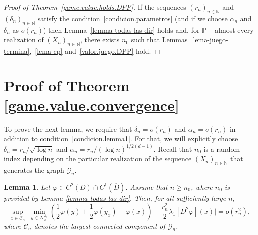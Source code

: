 \documentclass[11pt]{amsart}
\newtheorem{lemma}{Lemma}
\theoremstyle{definition}
\theoremstyle{remark}
\numberwithin{equation}{section}
\newcommand{\N}{{\mathbb N}}
\renewcommand{\P}{\mathbb{P}}
\newcommand{\G}{\mathcal{G}}
\newcommand{\C}{{\mathcal C}}
\newcommand{\Nc}{{\mathcal N}}
\begin{document}
\begin{proof}[Proof of Theorem~\ref{game.value.holds.DPP}]
If the sequences $(r_n)_{n\in \N}$ and $(\delta_n)_{n\in \N}$ satisfy the condition~\eqref{condicion.parametros} (and if we choose $\alpha_n$ and $\delta_n$ as $o(r_n)$) then Lemma~\ref{lemma-todas-las-dir} holds and, for $\P-$almost every realization of $(X_n)_{n\in\N}$, there exists $n_0$ such that Lemmas~\ref{lema-juego-termina},~\ref{lema-cp} and~\ref{valor.juego.DPP} hold.
\end{proof}

\section{Proof of Theorem \ref{game.value.convergence} }

To prove the next lemma, we require that $\delta_n = o(r_n)$ and $\alpha_n =o(r_n)$ in addition to condition~\eqref{condicion.lemma1}. For that, we will explicitly  choose $\delta_n = r_n/\sqrt{\log n}$ and $\alpha_n = r_n/(\log n)^{1/2(d-1)}$. 
Recall that $n_{0}$ is a random index depending on the particular realization of the sequence $(X_n)_{n\in\mathbb N}$ that generates the graph $\G_n$.


\begin{lemma} \label{JJJ}
Let $\varphi\in C^2(D)\cap C^1(\overline{D})$.
Assume that $n \geq n_0$, where $n_0$ is provided by Lemma \ref{lemma-todas-las-dir}. 
Then, for all sufficiently large $n$,
\begin{equation}
\label{consistent}
\sup_{x \in \C_n} 
\Big|
\min_{y\in \Nc_x^{\delta_n}}
\left(
\frac{1}{2} 
\varphi(y) 
+
\frac{1}{2}
\varphi(y_x) 
- 
\varphi(x)
\right)
-\frac{r_n^2}{2}
\lambda_1[D^2 \varphi](x)
\Big| 
= 
o(r_n^2)
,
\end{equation}
where $\C_n$ denotes the largest connected component of $\G_n$.
\end{lemma} 		
\end{document}
